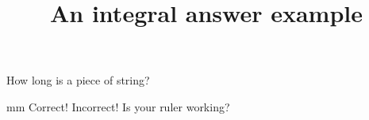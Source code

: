 \documentclass[hidesidemenu]{webquiz}
\title{An integral answer example}
\begin{document}
  \begin{question}     %
     How long is a piece of string?

      mm%
     \whenRight Correct!
     \whenWrong Incorrect! Is your ruler working?
  \end{question}
\end{document}
